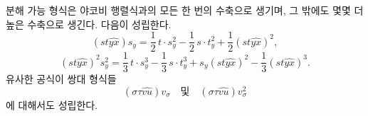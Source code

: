 
분해 가능 형식은 야코비 행렬식과의 모든 한 번의 수축으로 생기며, 그 밖에도 몇몇 더 높은 수축으로 생긴다. 다음이 성립한다.
\[
(st\widehat{yx})s_y=\frac12\,t\cdot s_y^2-\frac12\,s\cdot t_y^2+\frac12(st\widehat{yx})^2,
\]
\[
(st\widehat{yx})^2s_y^2=\frac13\,t\cdot s_y^3-\frac13\,s\cdot t_y^3+s_y(st\widehat{yx})^2-\frac13(st\widehat{yx})^3.
\]
유사한 공식이 쌍대 형식들
\[
(\sigma\tau\widehat{vu})v_\sigma
\quad\text{및}\quad
(\sigma\tau\widehat{vu})v_\sigma^2
\]
에 대해서도 성립한다.
